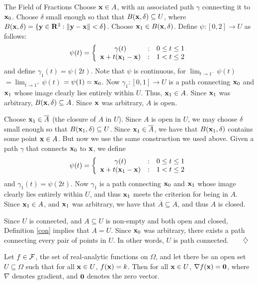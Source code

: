 \begin{section}{The Field of Fractions}
  Choose $\mathbf{x} \in A$, with an associated path $\gamma$ connecting it to $\mathbf{x}_0$.  Choose $\delta$ small enough so that that $B(\mathbf{x}, \delta) \subseteq U$, where $B(\mathbf{x},\delta) = \{\mathbf{y} \in \mathbf{R}^2 : \|\mathbf{y}-\mathbf{x}\| < \delta\}$.  Choose $\mathbf{x}_1 \in B(\mathbf{x},\delta)$.  Define $\psi: [0,2] \rightarrow U$ as follows:
\[
\psi(t) = \left\{ 	\begin{array}{ccc}
				\gamma(t) & : & {0 \le t \le 1} \\
				{\mathbf{x} + t(\mathbf{x}_1 - \mathbf{x})} & : & {1 < t \le 2}
			\end{array} \right.
\]
and define $\gamma_1(t) = \psi(2t)$.  Note that $\psi$ is continuous, for $\lim_{t \to 1^-}\psi(t)$ $= \lim_{t \to 1^+}\psi(t)$ $= \psi(1) = \mathbf{x}_0$.  Now $\gamma_1 : [0, 1] \longrightarrow U$ is a path connecting $\mathbf{x}_0$ and $\mathbf{x}_1$ whose image clearly lies entirely within $U$.  Thus, $\mathbf{x}_1 \in A$.  Since $\mathbf{x}_1$ was arbitrary, $B(\mathbf{x},\delta) \subseteq A$.  Since $\mathbf{x}$ was arbitrary, $A$ is open.

  Choose $\mathbf{x}_1 \in \overline{A}$ (the closure of $A$ in $U$).  Since $A$ is open in $U$, we may choose $\delta$ small enough so that $B(\mathbf{x}_1,\delta) \subseteq U$.  Since $\mathbf{x}_1 \in \overline{A}$, we have that $B(\mathbf{x}_1,\delta)$ contains some point $\mathbf{x} \in A$.  But now we use the same construction we used above.  Given a path $\gamma$ that connects $\mathbf{x}_0$ to $\mathbf{x}$, we define
\[
\psi(t) = \left\{ 	\begin{array}{ccc}
				\gamma(t) & : & {0 \le t \le 1} \\
				{\mathbf{x} + t(\mathbf{x}_1 - \mathbf{x})} & : & {1 < t \le 2}
			\end{array} \right.
\]
and $\gamma_1(t) = \psi(2t)$.  Now $\gamma_1$ is a path connecting $\mathbf{x}_0$ and $\mathbf{x}_1$ whose image clearly lies entirely within $U$, and thus $\mathbf{x}_1$ meets the criterion for being in $A$.  Since $\mathbf{x}_1 \in A$, and $\mathbf{x}_1$ was arbitrary, we have that $\overline{A} \subseteq A$, and thus $A$ is closed.

Since $U$ is connected, and $A \subseteq U$ is non-empty and both open and closed, Definition \ref{con} implies that $A = U$.  Since $\mathbf{x}_0$ was arbitrary, there exists a path connecting every pair of points in $U$.  In other words, $U$ is path connected.$\qquad \diamondsuit$

\begin{lemma}
\label{zeroderivone}
Let $f \in \mathcal{F}$, the set of real-analytic functions on $\Omega$, and let there be an open set $U \subseteq \Omega$ such that for all $\mathbf{x} \in U$, $f(\mathbf{x}) = k$.  Then for all $\mathbf{x} \in U$, $\nabla f(\mathbf{x}) = \mathbf{0}$, where $\nabla$ denotes gradient, and $\mathbf{0}$ denotes the zero vector.
\end{lemma}


\end{section}
